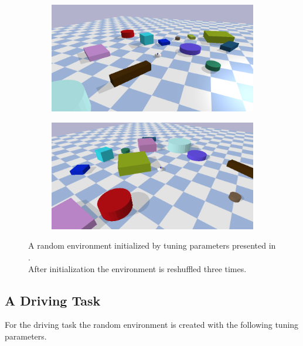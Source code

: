 \begin{figure}[H]
    \vspace{0.2cm}
    \begin{subfigure}{.49\textwidth}
    \includegraphics[width=\textwidth]{figures/results/random3}
    \end{subfigure}
    \hfill
    \begin{subfigure}{.49\textwidth}
    \centering
    \includegraphics[width=\textwidth]{figures/results/random4}
    \end{subfigure}
    \caption{A random environment initialized by tuning parameters presented in .\\After initialization the environment is reshuffled three times.}%
    \label{fig:random_environment_reshuffle}
\end{figure}

\subsection{A Driving Task}%
\label{subsec:rand_driving}
For the driving task the random environment is created with the following tuning parameters.\bs

